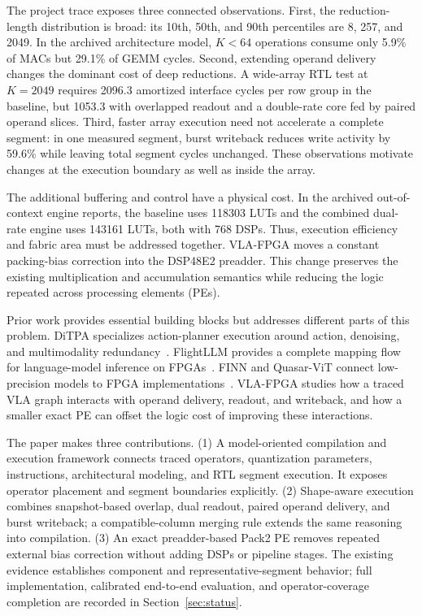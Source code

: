 \documentclass[10pt,conference,letterpaper]{IEEEtran}
\begin{document}
The project trace exposes three connected observations. First, the reduction-length distribution is broad: its 10th, 50th, and 90th percentiles are 8, 257, and 2049. In the archived architecture model, $K<64$ operations consume only 5.9\% of MACs but 29.1\% of GEMM cycles. Second, extending operand delivery changes the dominant cost of deep reductions. A wide-array RTL test at $K=2049$ requires 2096.3 amortized interface cycles per row group in the baseline, but 1053.3 with overlapped readout and a double-rate core fed by paired operand slices. Third, faster array execution need not accelerate a complete segment: in one measured segment, burst writeback reduces write activity by 59.6\% while leaving total segment cycles unchanged. These observations motivate changes at the execution boundary as well as inside the array.

The additional buffering and control have a physical cost. In the archived out-of-context engine reports, the baseline uses 118303 LUTs and the combined dual-rate engine uses 143161 LUTs, both with 768 DSPs. Thus, execution efficiency and fabric area must be addressed together. VLA-FPGA moves a constant packing-bias correction into the DSP48E2 preadder. This change preserves the existing multiplication and accumulation semantics while reducing the logic repeated across processing elements (PEs).

Prior work provides essential building blocks but addresses different parts of this problem. DiTPA specializes action-planner execution around action, denoising, and multimodality redundancy~\cite{ditpa}. FlightLLM provides a complete mapping flow for language-model inference on FPGAs~\cite{flight}. FINN and Quasar-ViT connect low-precision models to FPGA implementations~\cite{finn,quasar}. VLA-FPGA studies how a traced VLA graph interacts with operand delivery, readout, and writeback, and how a smaller exact PE can offset the logic cost of improving these interactions.

The paper makes three contributions. (1) A model-oriented compilation and execution framework connects traced operators, quantization parameters, instructions, architectural modeling, and RTL segment execution. It exposes operator placement and segment boundaries explicitly. (2) Shape-aware execution combines snapshot-based overlap, dual readout, paired operand delivery, and burst writeback; a compatible-column merging rule extends the same reasoning into compilation. (3) An exact preadder-based Pack2 PE removes repeated external bias correction without adding DSPs or pipeline stages. The existing evidence establishes component and representative-segment behavior; full implementation, calibrated end-to-end evaluation, and operator-coverage completion are recorded in Section~\ref{sec:status}.
\end{document}
